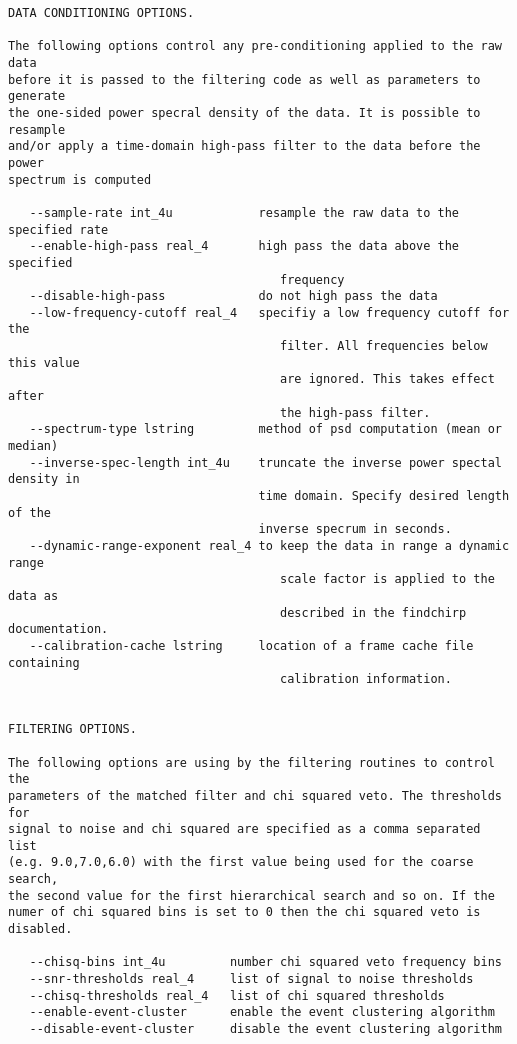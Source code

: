 \begin{verbatim}
DATA CONDITIONING OPTIONS.

The following options control any pre-conditioning applied to the raw data
before it is passed to the filtering code as well as parameters to generate
the one-sided power specral density of the data. It is possible to resample
and/or apply a time-domain high-pass filter to the data before the power
spectrum is computed

   --sample-rate int_4u            resample the raw data to the specified rate
   --enable-high-pass real_4       high pass the data above the specified
                                      frequency
   --disable-high-pass             do not high pass the data
   --low-frequency-cutoff real_4   specifiy a low frequency cutoff for the
                                      filter. All frequencies below this value
                                      are ignored. This takes effect after
                                      the high-pass filter.
   --spectrum-type lstring         method of psd computation (mean or median)
   --inverse-spec-length int_4u    truncate the inverse power spectal density in
                                   time domain. Specify desired length of the
                                   inverse specrum in seconds.
   --dynamic-range-exponent real_4 to keep the data in range a dynamic range
                                      scale factor is applied to the data as
                                      described in the findchirp documentation.
   --calibration-cache lstring     location of a frame cache file containing
                                      calibration information.


FILTERING OPTIONS.

The following options are using by the filtering routines to control the
parameters of the matched filter and chi squared veto. The thresholds for
signal to noise and chi squared are specified as a comma separated list
(e.g. 9.0,7.0,6.0) with the first value being used for the coarse search,
the second value for the first hierarchical search and so on. If the
numer of chi squared bins is set to 0 then the chi squared veto is disabled.

   --chisq-bins int_4u         number chi squared veto frequency bins
   --snr-thresholds real_4     list of signal to noise thresholds
   --chisq-thresholds real_4   list of chi squared thresholds
   --enable-event-cluster      enable the event clustering algorithm
   --disable-event-cluster     disable the event clustering algorithm



\end{verbatim}
